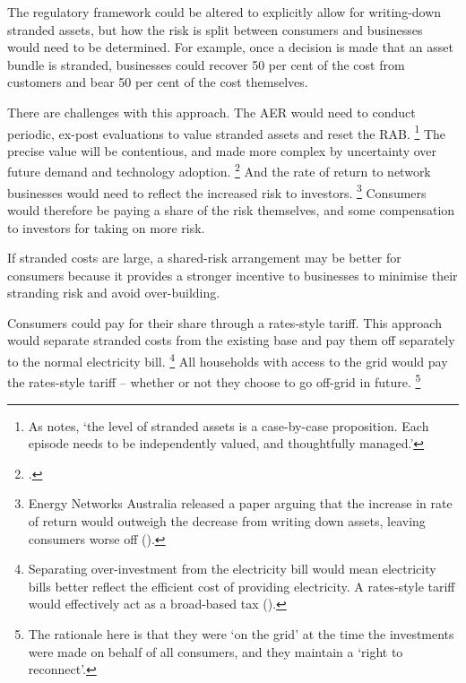 \documentclass[FrontPage]{grattan}
\begin{document}
The regulatory framework could be altered to explicitly allow for writing-down stranded assets, but how the risk is split between consumers and businesses would need to be determined. For example, once a decision is made that an asset bundle is stranded, businesses could recover 50 per cent of the cost from customers and bear 50 per cent of the cost themselves. 

There are challenges with this approach. The AER would need to conduct periodic, ex-post evaluations to value stranded assets and reset the RAB\@.%
\footnote{As \textcite{simshauser2017monopoly} notes, `the level of stranded assets is a case-by-case proposition. Each episode needs to be independently valued, and thoughtfully managed.'}
The precise value will be contentious, and made more complex by uncertainty over future demand and technology adoption.%
\footcite{simshauser2017monopoly}
And the rate of return to network businesses would need to reflect the increased risk to investors.%
\footnote{Energy Networks Australia released a paper arguing that the increase in rate of return would outweigh the decrease from writing down assets, leaving consumers worse off (\textcite{Crawford2014WrittendownValue}).}
Consumers would therefore be paying a share of the risk themselves, and some compensation to investors for taking on more risk.


If stranded costs are large, a shared-risk arrangement may be better for consumers because it provides a stronger incentive to businesses to minimise their stranding risk and avoid over-building.

Consumers could pay for their share through a rates-style tariff. This approach would separate stranded costs from the existing base and pay them off separately to the normal electricity bill.%
\footnote{Separating over-investment from the electricity bill would mean electricity bills better reflect the efficient cost of providing electricity. A rates-style tariff would effectively act as a broad-based tax (\textcite[][59]{Helm2017CostofEnergyReview}).}
All households with access to the grid would pay the rates-style tariff -- whether or not they choose to go off-grid in future.%
\footnote{The rationale here is that they were `on the grid' at the time the investments were made on behalf of all consumers, and they maintain a `right to reconnect'.}
\end{document}
